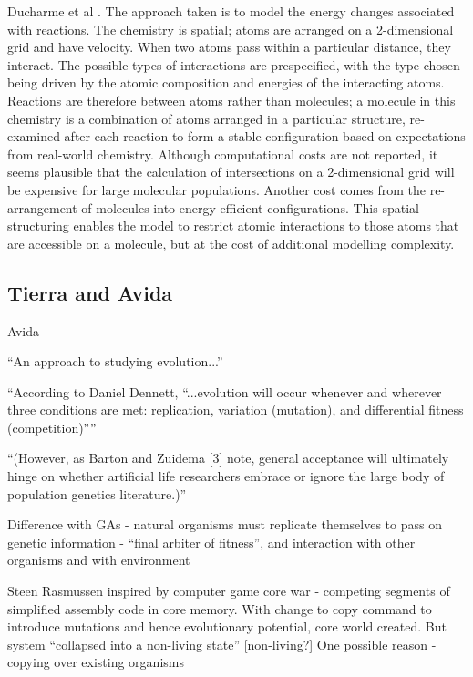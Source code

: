 Ducharme et al \parencite{Ducharme2012}. The approach taken is to model the energy changes associated with reactions. The chemistry is spatial; atoms are arranged on a 2-dimensional grid and have velocity. When two atoms pass within a particular distance, they interact. The possible types of interactions are prespecified, with the type chosen being driven by the atomic composition and energies of the interacting atoms. Reactions are therefore between atoms rather than molecules; a molecule in this chemistry is a combination of atoms arranged in a particular structure, re-examined after each reaction to form a stable configuration based on expectations from real-world chemistry. Although computational costs are not reported, it seems plausible that the calculation of intersections on a 2-dimensional grid will be expensive for large molecular populations. Another cost comes from the re-arrangement of molecules into energy-efficient configurations. This spatial structuring enables the model to restrict atomic interactions to those atoms that are accessible on a molecule, but at the cost of additional modelling complexity. 


\subsection{Tierra and Avida}

\autocite{Ofria2004}

Avida

	
	``An approach to studying evolution...''

	
	``According to Daniel Dennett, ``...evolution will occur whenever and
	wherever three conditions are met: replication, variation (mutation),
	and differential fitness (competition)''''

	
	``(However, as Barton and Zuidema {[}3{]} note, general acceptance
	will ultimately hinge on whether artificial life researchers embrace
	or ignore the large body of population genetics literature.)''
	

	Difference with GAs - natural organisms must replicate themselves to
	pass on genetic information - ``final arbiter of fitness'', and
	interaction with other organisms and with environment

	Steen Rasmussen inspired by computer game core war - competing
	segments of simplified assembly code in core memory. With change to
	copy command to introduce mutations and hence evolutionary potential,
	core world created. But system ``collapsed into a non-living state''
	{[}non-living?{]} One possible reason - copying over existing
	organisms

